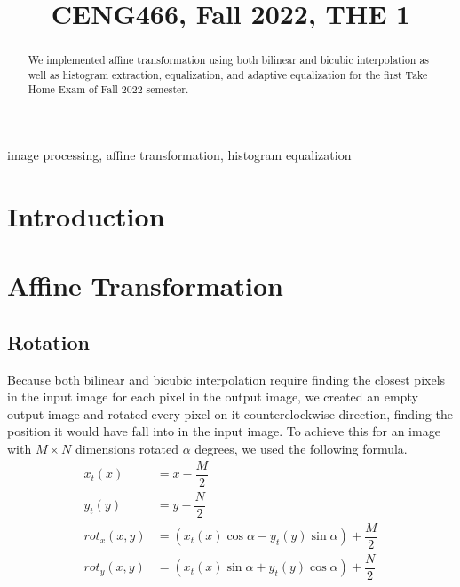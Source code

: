 \documentclass[conference]{IEEEtran}
\begin{document}
\title{CENG466, Fall 2022, THE 1\\

}

\author{
\and
{}
}

\maketitle

\begin{abstract}
We implemented affine transformation using both bilinear and bicubic interpolation as well as histogram extraction, equalization, and adaptive equalization for the first Take Home Exam of Fall 2022 semester.
\end{abstract}

\begin{IEEEkeywords}
image processing, affine transformation, histogram equalization
\end{IEEEkeywords}

\section{Introduction}

\section{Affine Transformation}

\subsection{Rotation}
Because both bilinear and bicubic interpolation require finding the closest pixels in the input image for each pixel in the output image, we created an empty output image and rotated every pixel on it counterclockwise direction, finding the position it would have fall into in the input image. To achieve this for an image with $M\times N$ dimensions rotated $\alpha$ degrees, we used the following formula.
\begin{align}
	x_t(x) &= x - \dfrac{M}{2}\\
	y_t(y) &= y - \dfrac{N}{2}\\
	\textit{rot}_x(x,y) &= (x_t(x)\cos \alpha - y_t(y) \sin \alpha ) + \dfrac{M}{2}\\
	\textit{rot}_y(x,y) &= (x_t(x)\sin \alpha + y_t(y) \cos \alpha ) + \dfrac{N}{2}
\end{align}
\end{document}

